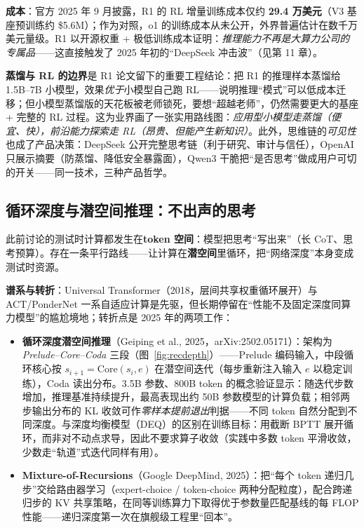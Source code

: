 \documentclass[12pt,a4paper]{article}
\begin{document}
\textbf{成本}：官方 2025 年 9 月披露，R1 的 RL 增量训练成本仅约 \textbf{29.4 万美元}（V3 基座预训练约 \$5.6M）；作为对照，o1 的训练成本从未公开，外界普遍估计在数千万美元量级。R1 以开源权重 + 极低训练成本证明：\emph{推理能力不再是大算力公司的专属品}——这直接触发了 2025 年初的“DeepSeek 冲击波”（见第 11 章）。

\textbf{蒸馏与 RL 的边界}是 R1 论文留下的重要工程结论：把 R1 的推理样本蒸馏给 1.5B--7B 小模型，效果\emph{优于}小模型自己跑 RL——说明推理“模式”可以低成本迁移；但小模型蒸馏版的天花板被老师锁死，要想“超越老师”，仍然需要更大的基座 + 完整的 RL 过程。这为业界画了一张实用路线图：\emph{应用型小模型走蒸馏（便宜、快），前沿能力探索走 RL（昂贵、但能产生新知识）}。此外，思维链的\emph{可见性}也成了产品决策：DeepSeek 公开完整思考链（利于研究、审计与信任），OpenAI 只展示摘要（防蒸馏、降低安全暴露面），Qwen3 干脆把“是否思考”做成用户可切的开关——同一技术，三种产品哲学。

\subsection{循环深度与潜空间推理：不出声的思考}

此前讨论的测试时计算都发生在\textbf{token 空间}：模型把思考“写出来”（长 CoT、思考预算）。存在一条平行路线——让计算在\textbf{潜空间}里循环，把“网络深度”本身变成测试时资源。

\textbf{谱系与转折}：Universal Transformer（2018，层间共享权重循环展开）与 ACT/PonderNet 一系自适应计算是先驱，但长期停留在“性能不及固定深度同算力模型”的尴尬境地；转折点是 2025 年的两项工作：
\begin{itemize}
  \item \textbf{循环深度潜空间推理}（Geiping et al., 2025，arXiv:2502.05171）：架构为 \emph{Prelude--Core--Coda} 三段（图~\ref{fig:recdepth}）——Prelude 编码输入，中段循环核心按 $s_{i+1}=\mathrm{Core}(s_i, e)$ 在潜空间迭代（每步重新注入输入 $e$ 以稳定训练），Coda 读出分布。3.5B 参数、800B token 的概念验证显示：随迭代步数增加，推理基准持续提升，最高表现出约 50B 参数模型的计算负载；相邻两步输出分布的 KL 收敛可作\emph{零样本提前退出}判据——不同 token 自然分配到不同深度。与深度均衡模型（DEQ）的区别在训练目标：用截断 BPTT 展开循环，而非对不动点求导，因此不要求算子收敛（实践中多数 token 平滑收敛，少数走“轨道”式迭代同样有用）。
  \item \textbf{Mixture-of-Recursions}（Google DeepMind, 2025）：把“每个 token 递归几步”交给路由器学习（expert-choice / token-choice 两种分配粒度），配合跨递归步的 KV 共享策略，在同等训练算力下取得优于参数量匹配基线的每 FLOP 性能——递归深度第一次在旗舰级工程里“回本”。
\end{itemize}
\end{document}
